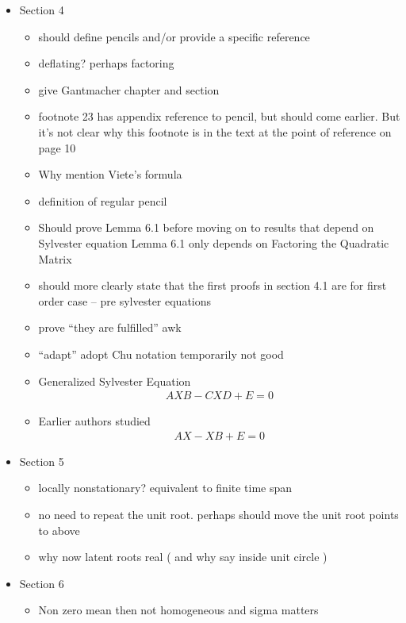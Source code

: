 \documentclass[12pt]{article}
\begin{document}
\begin{itemize}
\item Section 4



  \begin{itemize}
  \item should define pencils and/or provide a specific reference
  \item deflating? perhaps factoring
  \item give Gantmacher chapter and section
  \item footnote 23 has appendix reference to pencil, but should come earlier.
But it's not clear why this footnote is in the text at the point of reference on page 10
\item Why mention Viete's formula
\item definition of regular pencil
  \item  Should prove Lemma 6.1 before moving on to results that depend on
Sylvester equation  Lemma 6.1 only depends on Factoring the Quadratic Matrix

\item should more clearly state that the first proofs in section 4.1 are for first order case -- pre sylvester equations
\item prove ``they are fulfilled'' awk
\item ``adapt'' adopt Chu notation temporarily not good
\item Generalized Sylvester Equation\cite{chu87}
    \begin{gather*}
      AXB - CXD +E =0
    \end{gather*}
\item Earlier authors studied\cite{sylvester84,bartels72}
\begin{gather*}
      AX - XB +E =0
\end{gather*}
  \end{itemize}

\item Section 5
  \begin{itemize}
    \item locally nonstationary? equivalent to finite time span
    \item no need to repeat the unit root.  perhaps should move the unit root points to above
    \item why now  latent roots real  ( and why say inside unit circle )
  \end{itemize}

\item Section 6
  \begin{itemize}
    \item Non zero mean then not homogeneous and sigma matters
  \end{itemize}


\end{itemize}
\end{document}
